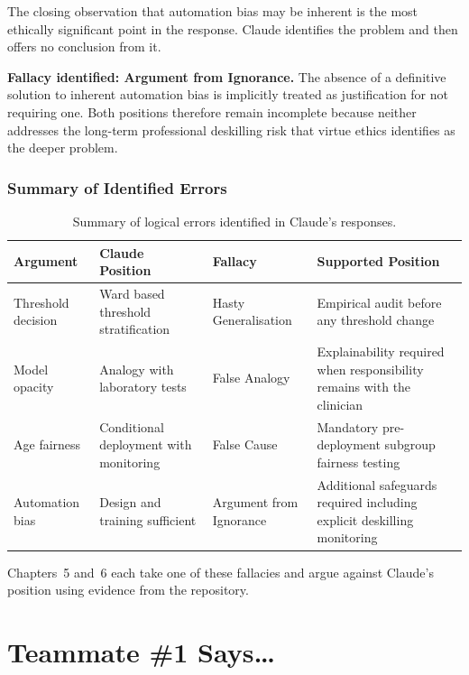 \documentclass[]{UCD_CS_41820_Report}
\begin{document}
The closing observation that automation bias may be inherent is the most ethically
significant point in the response. Claude identifies the problem and then offers no
conclusion from it.
\par\medskip
\textbf{Fallacy identified: Argument from Ignorance.} The absence of a definitive
solution to inherent automation bias is implicitly treated as justification for not
requiring one. Both positions therefore remain incomplete because neither addresses
the long-term professional deskilling risk that virtue ethics identifies as the
deeper problem.

\subsection*{Summary of Identified Errors}

\begin{table}[H]
\centering
\renewcommand{\arraystretch}{1.3}
\begin{tabular}{@{}p{2.5cm}p{3cm}p{3cm}p{4.5cm}@{}}
\toprule
\textbf{Argument} & \textbf{Claude Position} & \textbf{Fallacy} & \textbf{Supported Position} \\
\midrule
Threshold decision
  & Ward based threshold stratification
  & Hasty Generalisation
  & Empirical audit before any threshold change \\[4pt]
Model opacity
  & Analogy with laboratory tests
  & False Analogy
  & Explainability required when responsibility remains with the clinician \\[4pt]
Age fairness
  & Conditional deployment with monitoring
  & False Cause
  & Mandatory pre-deployment subgroup fairness testing \\[4pt]
Automation bias
  & Design and training sufficient
  & Argument from Ignorance
  & Additional safeguards required including explicit deskilling monitoring \\
\bottomrule
\end{tabular}
\caption{Summary of logical errors identified in Claude's responses.}
\label{tab:claude_errors}
\end{table}

Chapters~5 and~6 each take one of these fallacies and argue against Claude's
position using evidence from the repository.
\chapter{Teammate \#1 Says\ldots}
\end{document}
